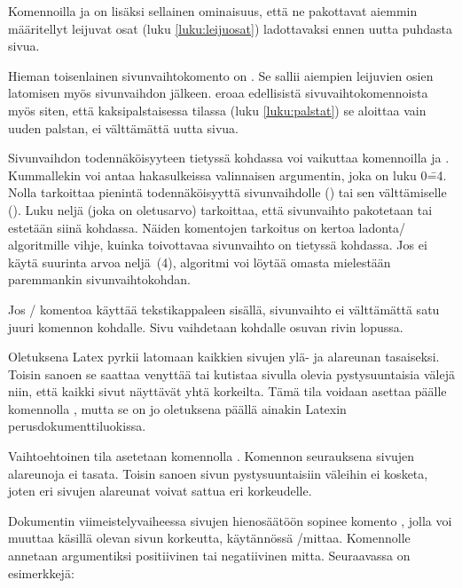Komennoilla  ja  on lisäksi
sellainen ominaisuus, että ne pakottavat aiemmin määritellyt leijuvat
osat (luku \ref{luku:leijuosat}) ladottavaksi ennen uutta puhdasta
sivua.

Hieman toisenlainen sivunvaihtokomento on . Se sallii
aiempien leijuvien osien latomisen myös sivunvaihdon jälkeen.
 eroaa edellisistä sivuvaihtokomennoista myös siten,
että kaksipalstaisessa tilassa (luku \ref{luku:palstat}) se aloittaa
vain uuden palstan, ei välttämättä uutta sivua.

Sivunvaihdon todennäköisyyteen tietyssä kohdassa voi vaikuttaa
komennoilla  ja . Kummallekin
voi antaa hakasulkeissa valinnaisen argumentin, joka on luku 0\==4.
Nolla tarkoittaa pienintä todennäköisyyttä sivunvaihdolle
() tai sen välttämiselle
(). Luku neljä (joka on oletusarvo)
tarkoittaa, että sivunvaihto pakotetaan tai estetään siinä kohdassa.
Näiden komentojen tarkoitus on kertoa ladonta\-/ algoritmille vihje,
kuinka toivottavaa sivunvaihto on tietyssä kohdassa. Jos ei käytä
suurinta arvoa neljä~(4), algoritmi voi löytää omasta mielestään
paremmankin sivunvaihtokohdan.

\begin{koodilohkosis}
\pagebreak[3]  %
\nopagebreak   %
\end{koodilohkosis}

Jos \-/ komentoa käyttää tekstikappaleen sisällä,
sivunvaihto ei välttämättä satu juuri komennon kohdalle. Sivu vaihdetaan
kohdalle osuvan rivin lopussa.

Oletuksena Latex pyrkii latomaan kaikkien sivujen ylä- ja alareunan
tasaiseksi. Toisin sanoen se saattaa venyttää tai kutistaa sivulla
olevia pystysuuntaisia välejä niin, että kaikki sivut näyttävät yhtä
korkeilta. Tämä tila voidaan asettaa päälle komennolla
, mutta se on jo oletuksena päällä ainakin Latexin
perusdokumenttiluokissa.

Vaihtoehtoinen tila asetetaan komennolla .
Komennon seurauksena sivujen alareunoja ei tasata. Toisin sanoen sivun
pystysuuntaisiin väleihin ei kosketa, joten eri sivujen alareunat voivat
sattua eri korkeudelle.

Dokumentin viimeistelyvaiheessa sivujen hienosäätöön sopinee komento
, jolla voi muuttaa käsillä olevan sivun
korkeutta, käytännössä \-/mittaa. Komennolle annetaan
argumentiksi positiivinen tai negatiivinen mitta. Seuraavassa on
esimerkkejä:

